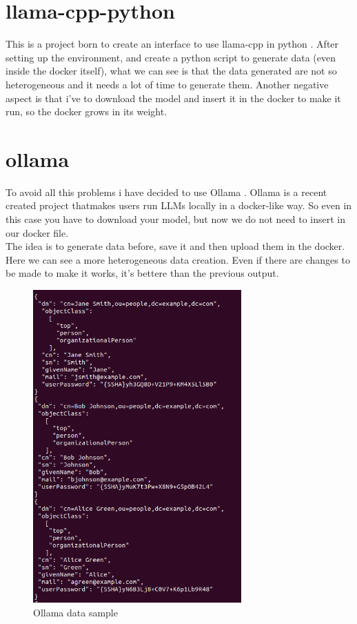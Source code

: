 \section{llama-cpp-python}
This is a project born to create an interface to use llama-cpp in python \cite{llama-cpp-python}.
After setting up the environment, and create a python script to generate data (even inside the docker itself), what we can see is that the data generated are not so heterogeneous and it needs a lot of time to generate them.
Another negative aspect is that i've to download the model and insert it in the docker to make it run, so the docker grows in its weight.
\section{ollama}
To avoid all this problems i have decided to use Ollama \cite{ollama}. Ollama is a recent created project thatmakes users run LLMs locally in a docker-like way. So even in this case you have to download your model, but now we do not need to insert in our docker file.
\\
The idea is to generate data before, save it and then upload them in the docker.
Here we can see a more heterogeneous data creation. Even if there are changes to be made to make it works, it's bettere than the previous output.
\begin{figure}[h]
    \caption{Ollama data sample}
    \centering
    \includegraphics[width=8cm]{img/oll.png}
\end{figure}\\\\

